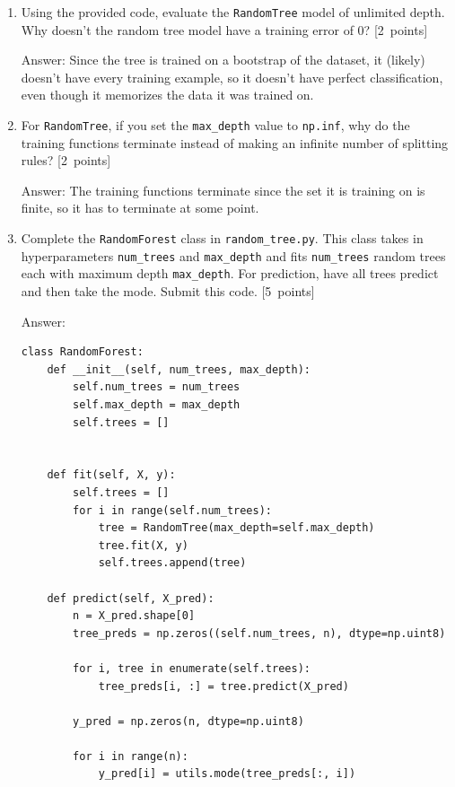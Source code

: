 \documentclass{article}
\newcommand{\blu}[1]{{\textcolor{blu}{#1}}}
\newenvironment{answer}{\par\begingroup\color{gre}Answer: }{\endgroup}
\let\ask\blu
\newcommand\pts[1]{\textcolor{pointscolour}{[#1~points]}}
\begin{document}
    \begin{enumerate}
        \item Using the provided code, evaluate the \texttt{RandomTree} model of unlimited depth. \ask{Why doesn't the random tree model have a training error of 0?} \pts{2}
        \begin{answer}
            Since the tree is trained on a bootstrap of the dataset, it (likely) doesn't have every training example, so it doesn't have perfect classification, even though it memorizes the data it was trained on.
        \end{answer}
        \item For \texttt{RandomTree}, if you set the \texttt{max\_depth} value to \texttt{np.inf}, \ask{why do the training functions terminate instead of making an infinite number of splitting rules?} \pts{2}
        \begin{answer}
            The training functions terminate since the set it is training on is finite, so it has to terminate at some point.
        \end{answer}
        \item Complete the \texttt{RandomForest} class in \texttt{random\string_tree.py}. This class takes in hyperparameters \texttt{num\string_trees} and \texttt{max\string_depth} and
        fits \texttt{num\string_trees} random trees each with maximum depth \texttt{max\string_depth}. For prediction, have all trees predict and then take the mode. \ask{Submit this code.} \pts{5}
        
        \begin{answer}
            \begin{lstlisting}
class RandomForest:
    def __init__(self, num_trees, max_depth):
        self.num_trees = num_trees
        self.max_depth = max_depth
        self.trees = []


    def fit(self, X, y):
        self.trees = []
        for i in range(self.num_trees):
            tree = RandomTree(max_depth=self.max_depth)
            tree.fit(X, y)
            self.trees.append(tree)

    def predict(self, X_pred):
        n = X_pred.shape[0]
        tree_preds = np.zeros((self.num_trees, n), dtype=np.uint8)

        for i, tree in enumerate(self.trees):
            tree_preds[i, :] = tree.predict(X_pred)

        y_pred = np.zeros(n, dtype=np.uint8)

        for i in range(n):
            y_pred[i] = utils.mode(tree_preds[:, i])


\end{lstlisting}
\end{answer}
\end{enumerate}
\end{document}
